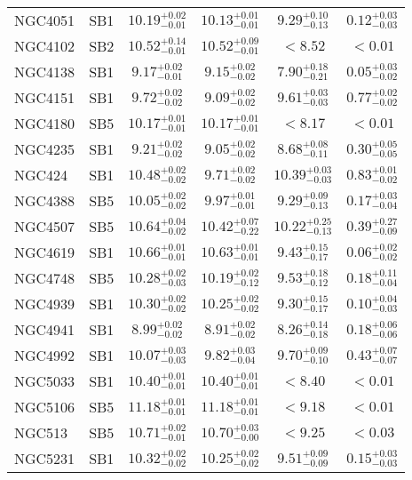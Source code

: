 \documentclass[onecolumn]{mn2e}
\begin{document}
{\begin{center}
\begin{longtable}{lccccc}
NGC4051 & SB1 & $10.19_{-0.01}^{+0.02}$ & $10.13_{-0.01}^{+0.01}$ & $9.29_{-0.13}^{+0.10}$ &$0.12_{-0.03}^{+0.03}$ \\
NGC4102 & SB2 & $10.52_{-0.01}^{+0.14}$ & $10.52_{-0.01}^{+0.09}$ & $<8.52$ &$<0.01$ \\
NGC4138 & SB1 & $9.17_{-0.01}^{+0.02}$ & $9.15_{-0.02}^{+0.02}$ & $7.90_{-0.21}^{+0.18}$ &$0.05_{-0.02}^{+0.03}$ \\
NGC4151 & SB1 & $9.72_{-0.02}^{+0.02}$ & $9.09_{-0.02}^{+0.02}$ & $9.61_{-0.03}^{+0.03}$ &$0.77_{-0.02}^{+0.02}$ \\
NGC4180 & SB5 & $10.17_{-0.01}^{+0.01}$ & $10.17_{-0.01}^{+0.01}$ & $<8.17$ &$<0.01$ \\
NGC4235 & SB1 & $9.21_{-0.02}^{+0.02}$ & $9.05_{-0.02}^{+0.02}$ & $8.68_{-0.11}^{+0.08}$ &$0.30_{-0.05}^{+0.05}$ \\
NGC424 & SB1 & $10.48_{-0.02}^{+0.02}$ & $9.71_{-0.02}^{+0.02}$ & $10.39_{-0.03}^{+0.03}$ &$0.83_{-0.02}^{+0.01}$ \\
NGC4388 & SB5 & $10.05_{-0.02}^{+0.02}$ & $9.97_{-0.01}^{+0.01}$ & $9.29_{-0.13}^{+0.09}$ &$0.17_{-0.04}^{+0.03}$ \\
NGC4507 & SB5 & $10.64_{-0.02}^{+0.04}$ & $10.42_{-0.22}^{+0.07}$ & $10.22_{-0.13}^{+0.25}$ &$0.39_{-0.09}^{+0.27}$ \\
NGC4619 & SB1 & $10.66_{-0.01}^{+0.01}$ & $10.63_{-0.01}^{+0.01}$ & $9.43_{-0.17}^{+0.15}$ &$0.06_{-0.02}^{+0.02}$ \\
NGC4748 & SB5 & $10.28_{-0.03}^{+0.02}$ & $10.19_{-0.12}^{+0.02}$ & $9.53_{-0.12}^{+0.18}$ &$0.18_{-0.04}^{+0.11}$ \\
NGC4939 & SB1 & $10.30_{-0.02}^{+0.02}$ & $10.25_{-0.02}^{+0.02}$ & $9.30_{-0.17}^{+0.15}$ &$0.10_{-0.03}^{+0.04}$ \\
NGC4941 & SB1 & $8.99_{-0.02}^{+0.02}$ & $8.91_{-0.02}^{+0.02}$ & $8.26_{-0.18}^{+0.14}$ &$0.18_{-0.06}^{+0.06}$ \\
NGC4992 & SB1 & $10.07_{-0.03}^{+0.03}$ & $9.82_{-0.04}^{+0.03}$ & $9.70_{-0.10}^{+0.09}$ &$0.43_{-0.07}^{+0.07}$ \\
NGC5033 & SB1 & $10.40_{-0.01}^{+0.01}$ & $10.40_{-0.01}^{+0.01}$ & $<8.40$ &$<0.01$ \\
NGC5106 & SB5 & $11.18_{-0.01}^{+0.01}$ & $11.18_{-0.01}^{+0.01}$ & $<9.18$ &$<0.01$ \\
NGC513 & SB5 & $10.71_{-0.01}^{+0.02}$ & $10.70_{-0.00}^{+0.03}$ & $<9.25$ &$<0.03$ \\
NGC5231 & SB1 & $10.32_{-0.02}^{+0.02}$ & $10.25_{-0.02}^{+0.02}$ & $9.51_{-0.09}^{+0.09}$ &$0.15_{-0.03}^{+0.03}$ \\

\end{longtable}
\end{center}}
\end{document}
